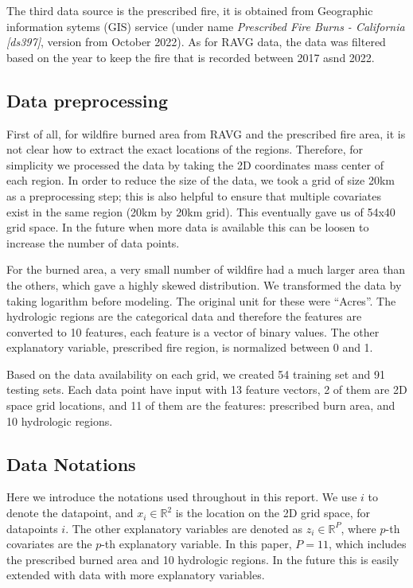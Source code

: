 \documentclass{article}
\begin{document}
The third data source is the prescribed fire, it is obtained from Geographic information sytems (GIS) service (under name \textit{Prescribed Fire Burns - California [ds397]}, version from October 2022). As for RAVG data, the data was filtered based on the year to keep the fire that is recorded between 2017 asnd 2022.

\subsection*{Data preprocessing}
First of all, for wildfire burned area from RAVG and the prescribed fire area, it is not clear how to extract the exact locations of the regions. Therefore, for simplicity we processed the data by taking the 2D coordinates mass center of each region. In order to reduce the size of the data, we took a grid of size 20km as a preprocessing step; this is also helpful to ensure that multiple covariates exist in the same region (20km by 20km grid). This eventually gave us of 54x40 grid space. In the future when more data is available this can be loosen to increase the number of data points. 

For the burned area, a very small number of wildfire had a much larger area than the others, which gave a highly skewed distribution. We transformed the data by taking logarithm before modeling. The original unit for these were ``Acres''. 
The hydrologic regions are the categorical data and therefore the features are converted to 10 features, each feature is a vector of binary values. The other explanatory variable, prescribed fire region, is normalized between 0 and 1. 

Based on the data availability on each grid, we created 54 training set and 91 testing sets. Each data point have input with 13 feature vectors, 2 of them are 2D space grid locations, and 11 of them are the features: prescribed burn area, and 10 hydrologic regions. 




\subsection*{Data Notations}
Here we introduce the notations used throughout in this report. We use $i$ to denote the datapoint, and $x_i \in \mathbb{R}^2$ is the location on the 2D grid space, for datapoints $i$. The other explanatory variables are denoted as $z_i \in \mathbb{R}^P$, where $p$-th covariates are the $p$-th explanatory variable. In this paper, $P=11$, which includes the prescribed burned area and 10 hydrologic regions. In the future this is easily extended with data with more explanatory variables. 
\end{document}
